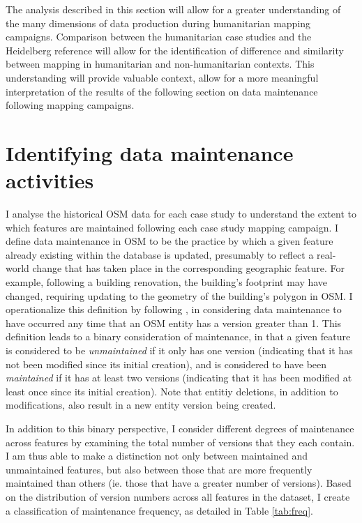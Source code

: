 The analysis described in this section will allow for a greater understanding of the many dimensions of data production during humanitarian mapping campaigns. Comparison between the humanitarian case studies and the Heidelberg reference will allow for the identification of difference and similarity between mapping in humanitarian and non-humanitarian contexts. This understanding will provide valuable context, allow for a more meaningful interpretation of the results of the following section on data maintenance following mapping campaigns.

\section{Identifying data maintenance activities}
\label{sec-maint}

I analyse the historical OSM data for each case study to understand the extent to which features are maintained following each case study mapping campaign. I define data maintenance in OSM to be the practice by which a given feature already existing within the database is updated, presumably to reflect a real-world change that has taken place in the corresponding geographic feature.  For example, following a building renovation, the building's footprint may have changed, requiring updating to the geometry of the building's polygon in OSM. 
I operationalize this definition by following \textcite{quattrone_work_2017}, in considering data maintenance to have occurred any time that an OSM entity has a version greater than 1. This definition leads to a binary consideration of maintenance, in that a given feature is considered to be \textit{unmaintained} if it only has one version (indicating that it has not been modified since its initial creation), and is considered to have been \textit{maintained} if it has at least two versions (indicating that it has been modified at least once since its initial creation). Note that entitiy deletions, in addition to modifications, also result in a new entity version being created. 

In addition to this binary perspective, I consider different degrees of maintenance across features by examining the total number of versions that they each contain. I am thus able to make a distinction not only between maintained and unmaintained features, but also between those that are more frequently maintained than others (ie. those that have a greater number of versions). Based on the distribution of version numbers across all features in the dataset, I create a classification of maintenance frequency, as detailed in Table \ref{tab:freq}. 

